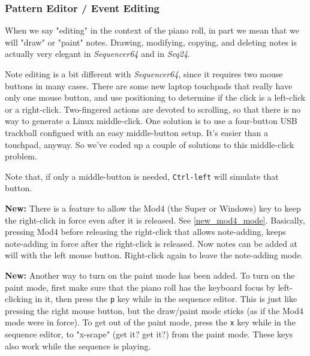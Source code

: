 \subsubsection{Pattern Editor / Event Editing}
\label{subsubsec:seq64_pattern_editor_event_editing}

   When we say "editing" in the context of the piano roll, in part we mean that
   we will "draw" 
   or "paint"  notes.
   Drawing, modifying, copying, and deleting
   notes is actually very elegant in \textsl{Sequencer64} and in
   \textsl{Seq24}.

   Note editing is a bit different with \textsl{Sequencer64}, since it
   requires two mouse buttons in many cases.  There are some new
   laptop touchpads that really have only one mouse button, and
   use positioning to determine if the click is a left-click or a right-click.
   Two-fingered actions are devoted to scrolling, so that there is no way
   to generate a Linux middle-click.
   One solution is to use a four-button USB trackball
   configued with an easy middle-button setup.
   It's easier than a touchpad, anyway.
   So we've coded up a couple of solutions to this middle-click problem.

   Note that, if only a middle-button is needed,
   \texttt{Ctrl-left} will simulate that button.


   \textbf{New:}
   There is a feature to allow the Mod4
   (the Super or Windows) key to keep the
   right-click in force even after it is released.  See \ref{new_mod4_mode}.
   Basically, pressing Mod4 before releasing the right-click that allows
   note-adding, keeps note-adding in force after the right-click is released.
   Now notes can be added at will with the left mouse button.  Right-click
   again to leave the note-adding mode.

   \textbf{New:}
   Another way to turn on the paint mode has been added.
   To turn on the paint mode, first make sure that the piano roll has the
   keyboard focus by left-clicking in it, then press the
   \texttt{p} key while in the sequence editor.
   This is just like pressing the right mouse button, but the draw/paint mode
   sticks (as if the Mod4 mode were in force).
   To get out of the paint mode, press the
   \texttt{x} key while in the sequence editor, to "x-scape" (get it? get it?)
   from the paint mode.
   These keys also work while the sequence is playing.

